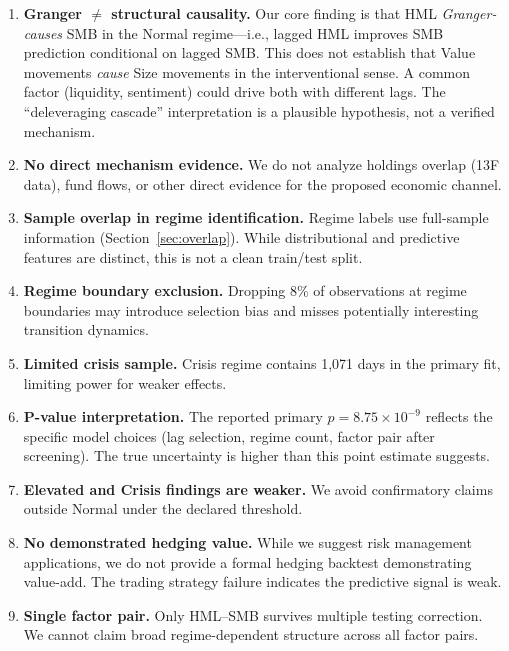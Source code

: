 \documentclass[sigconf]{acmart}
\begin{document}
\begin{enumerate}
    \item \textbf{Granger $\neq$ structural causality.} Our core finding is that
    HML \emph{Granger-causes} SMB in the Normal regime---i.e., lagged HML improves SMB
    prediction conditional on lagged SMB. This does not establish that Value
    movements \emph{cause} Size movements in the interventional sense. A common
    factor (liquidity, sentiment) could drive both with different lags. The
    ``deleveraging cascade'' interpretation is a plausible hypothesis, not a verified
    mechanism.

    \item \textbf{No direct mechanism evidence.} We do not analyze holdings overlap
    (13F data), fund flows, or other direct evidence for the proposed economic channel.

    \item \textbf{Sample overlap in regime identification.} Regime labels use full-sample
    information (Section~\ref{sec:overlap}). While distributional and predictive features
    are distinct, this is not a clean train/test split.

    \item \textbf{Regime boundary exclusion.} Dropping 8\% of observations at regime
    boundaries may introduce selection bias and misses potentially interesting
    transition dynamics.

    \item \textbf{Limited crisis sample.} Crisis regime contains 1,071 days in the
    primary fit, limiting power for weaker effects.

    \item \textbf{P-value interpretation.} The reported primary $p = 8.75 \times 10^{-9}$
    reflects the specific model choices (lag selection, regime count, factor pair
    after screening). The true uncertainty is higher than this point estimate suggests.

    \item \textbf{Elevated and Crisis findings are weaker.} We avoid confirmatory
    claims outside Normal under the declared threshold.

    \item \textbf{No demonstrated hedging value.} While we suggest risk management
    applications, we do not provide a formal hedging backtest demonstrating value-add.
    The trading strategy failure indicates the predictive signal is weak.

    \item \textbf{Single factor pair.} Only HML--SMB survives multiple testing correction.
    We cannot claim broad regime-dependent structure across all factor pairs.
\end{enumerate}
\end{document}
